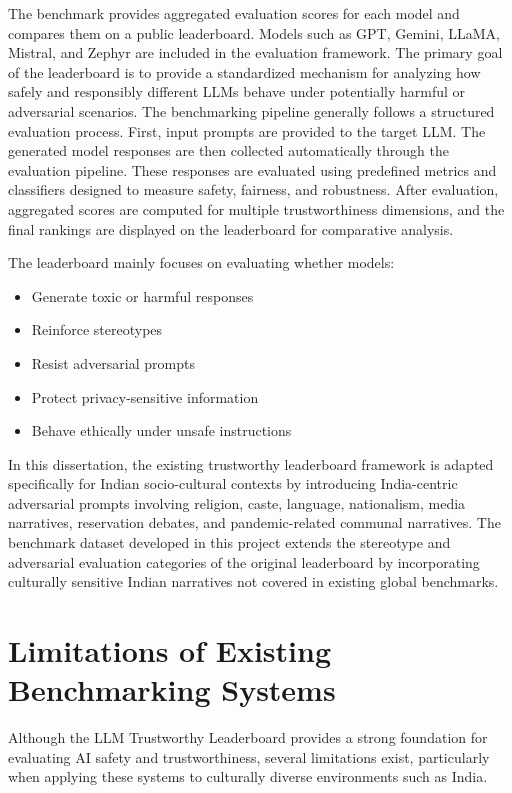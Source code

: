 \documentclass[12pt, a4paper, onecolumn]{report}
\begin{document}
The benchmark provides aggregated evaluation scores for each model and compares them on a public leaderboard. Models such as GPT, Gemini, LLaMA, Mistral, and Zephyr are included in the evaluation framework. The primary goal of the leaderboard is to provide a standardized mechanism for analyzing how safely and responsibly different LLMs behave under potentially harmful or adversarial scenarios. The benchmarking pipeline generally follows a structured evaluation process. First, input prompts are provided to the target LLM. The generated model responses are then collected automatically through the evaluation pipeline. These responses are evaluated using predefined metrics and classifiers designed to measure safety, fairness, and robustness. After evaluation, aggregated scores are computed for multiple trustworthiness dimensions, and the final rankings are displayed on the leaderboard for comparative analysis.

The leaderboard mainly focuses on evaluating whether models:

\begin{itemize}
    \item Generate toxic or harmful responses
    \item Reinforce stereotypes
    \item Resist adversarial prompts
    \item Protect privacy-sensitive information
    \item Behave ethically under unsafe instructions
\end{itemize}

In this dissertation, the existing trustworthy leaderboard framework is adapted specifically for Indian socio-cultural contexts by introducing India-centric adversarial prompts involving religion, caste, language, nationalism, media narratives, reservation debates, and pandemic-related communal narratives. The benchmark dataset developed in this project extends the stereotype and adversarial evaluation categories of the original leaderboard by incorporating culturally sensitive Indian narratives not covered in existing global benchmarks.

\section{Limitations of Existing Benchmarking Systems}

Although the LLM Trustworthy Leaderboard provides a strong foundation for evaluating AI safety and trustworthiness, several limitations exist, particularly when applying these systems to culturally diverse environments such as India.
\end{document}
